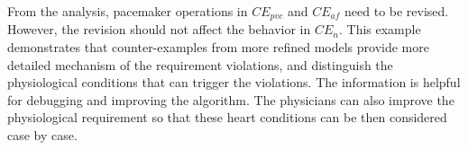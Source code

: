 From the analysis, pacemaker operations in $CE_{pvc}$ and $CE_{af}$ need to be revised. However, the revision should not affect the behavior in $CE_{n}$. This example demonstrates that counter-examples from more refined models provide more detailed mechanism of the requirement violations, and distinguish the physiological conditions that can trigger the violations. The information is helpful for debugging and improving the algorithm. The physicians can also improve the physiological requirement so that these heart conditions can be then considered case by case. %
%
 




